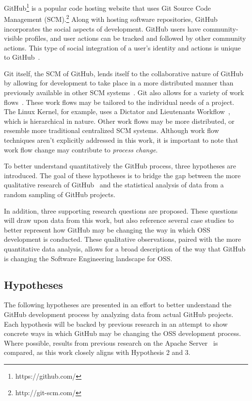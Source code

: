 \documentclass{proc}
\begin{document}
GitHub\footnote{https://github.com/} is a popular code hosting website that uses Git Source Code Management (SCM).\footnote{http://git-scm.com/} Along with hosting software repositories, GitHub incorporates the social aspects of development. GitHub users have community-visible profiles, and user actions can be tracked and followed by other community actions. This type of social integration of a user's identity and actions is unique to GitHub~\cite{dabbish2012social}. 

Git itself, the SCM of GitHub, lends itself to the collaborative nature of GitHub by allowing for development to take place in a more distributed manner than previously available in other SCM systems~\cite{spinellis2012git}.
Git also allows for a variety of work flows~\cite{chacon2009pro}. These work flows may be tailored to the individual needs of a project. The Linux Kernel, for example, uses a Dictator and Lieutenants Workflow~\cite{platschekfloss}, which is hierarchical in nature. Other work flows may be more distributed, or resemble more traditional centralized SCM systems. Although work flow techniques aren't explicitly addressed in this work, it is important to note that work flow change may contribute to \textit{process change}.

To better understand quantitatively the GitHub process, three hypotheses are introduced. The goal of these hypotheses is to bridge the gap between the more qualitative research of GitHub~\cite{dabbish2012social,begel2013social} and the statistical analysis of data from a random sampling of GitHub projects.

In addition, three supporting research questions are proposed. These questions will draw upon data from this work, but also reference several case studies to better represent how GitHub may be changing the way in which OSS development is conducted. These qualitative observations, paired with the more quantitative data analysis, allows for a broad description of the way that GitHub is changing the Software Engineering landscape for OSS.

\subsection{Hypotheses}
The following hypotheses are presented in an effort to better understand the GitHub development process by analyzing data from actual GitHub projects. Each hypothesis will be backed by previous research in an attempt to show concrete ways in which GitHub may be changing the OSS development process. Where possible, results from previous research on the Apache Server~\cite{mockus2000case} is compared, as this work closely aligns with Hypothesis 2 and 3.\\
\end{document}
